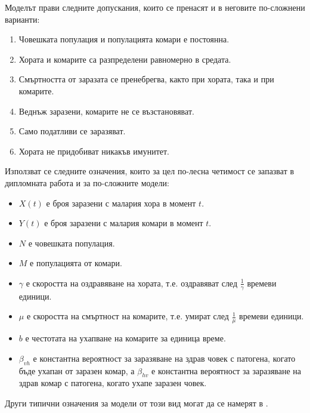 Моделът прави следните допускания, които се пренасят и в неговите по-сложнени варианти:
\begin{enumerate}
  \item Човешката популация и популацията комари е постоянна.
  \item Хората и комарите са разпределени равномерно в средата.
  \item Смъртността от заразата се пренебрегва, както при хората, така и при комарите.
  \item Веднъж заразени, комарите не се възстановяват.
  \item Само податливи се заразяват.
  \item Хората не придобиват никакъв имунитет.
\end{enumerate}

\begin{definition}
  \label{def:Parameters}
  Използват се следните означения, които за цел по-лесна четимост се запазват в дипломната работа и за по-сложните модели:
  \begin{itemize}
    \item $X(t)$ е броя заразени с малария хора в момент $t$.
    \item $Y(t)$ е броя заразени с малария комари в момент $t$.
    \item $N$ е човешката популация.
    \item $M$ е популацията от комари.
    \item $\gamma$ е скоростта на оздравяване на хората, т.е. оздравяват след $\frac{1}{\gamma}$ времеви единици.
    \item $\mu$ е скоростта на смъртност на комарите, т.е. умират след $\frac{1}{\mu}$ времеви единици.
    \item $b$ е честотата на ухапване на комарите за единица време.
    \item $\beta_{vh}$ е константна вероятност за заразяване на здрав човек с патогена, когато бъде ухапан от заразен комар, а $\beta_{hv}$ е константна вероятност за заразяване на здрав комар с патогена, когато ухапе заразен човек.
  \end{itemize}
\end{definition}

\begin{remark}
Други типични означения за модели от този вид могат да се намерят в \cite{Smith2012}.
\end{remark}

